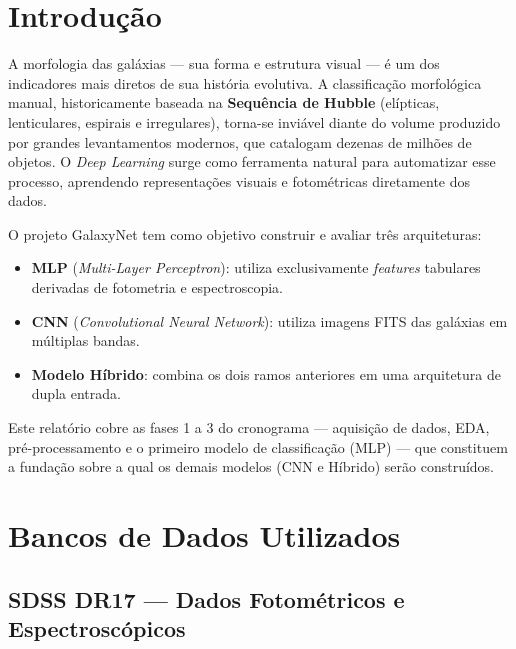 \documentclass[12pt, a4paper]{article}
\begin{document}
\newpage

\section{Introdução}

A morfologia das galáxias --- sua forma e estrutura visual --- é um dos
indicadores mais diretos de sua história evolutiva. A classificação morfológica
manual, historicamente baseada na \textbf{Sequência de Hubble} (elípticas,
lenticulares, espirais e irregulares), torna-se inviável diante do volume
produzido por grandes levantamentos modernos, que catalogam dezenas de milhões
de objetos. O \textit{Deep Learning} surge como ferramenta natural para
automatizar esse processo, aprendendo representações visuais e fotométricas
diretamente dos dados.

O projeto GalaxyNet tem como objetivo construir e avaliar três arquiteturas:
\begin{itemize}[leftmargin=2em]
  \item \textbf{MLP} (\textit{Multi-Layer Perceptron}): utiliza exclusivamente
        \textit{features} tabulares derivadas de fotometria e espectroscopia.
  \item \textbf{CNN} (\textit{Convolutional Neural Network}): utiliza imagens
        FITS das galáxias em múltiplas bandas.
  \item \textbf{Modelo Híbrido}: combina os dois ramos anteriores em uma
        arquitetura de dupla entrada.
\end{itemize}

Este relatório cobre as fases 1 a 3 do cronograma --- aquisição de dados,
EDA, pré-processamento e o primeiro modelo de classificação (MLP) --- que
constituem a fundação sobre a qual os demais modelos (CNN e Híbrido) serão
construídos.

\section{Bancos de Dados Utilizados}

\subsection{SDSS DR17 --- Dados Fotométricos e Espectroscópicos}
\end{document}
